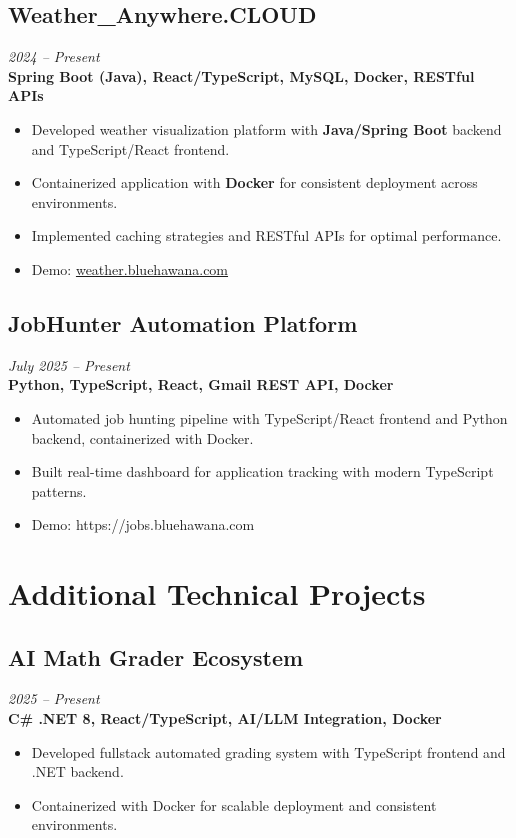\documentclass[10pt,a4paper]{article}
\begin{document}
\subsection*{Weather\_Anywhere.CLOUD}
\textit{2024 -- Present} \\
\textbf{Spring Boot (Java), React/TypeScript, MySQL, Docker, RESTful APIs}
\begin{itemize}[noitemsep]
\item Developed weather visualization platform with \textbf{Java/Spring Boot} backend and TypeScript/React frontend.
\item Containerized application with \textbf{Docker} for consistent deployment across environments.
\item Implemented caching strategies and RESTful APIs for optimal performance.
\item Demo: \href{https://weather.bluehawana.com}{weather.bluehawana.com}
\end{itemize}

\subsection*{JobHunter Automation Platform}
\textit{July 2025 -- Present} \\
\textbf{Python, TypeScript, React, Gmail REST API, Docker}
\begin{itemize}[noitemsep]
\item Automated job hunting pipeline with TypeScript/React frontend and Python backend, containerized with Docker.
\item Built real-time dashboard for application tracking with modern TypeScript patterns.
\item Demo: https://jobs.bluehawana.com
\end{itemize}

\section*{Additional Technical Projects}

\subsection*{AI Math Grader Ecosystem}
\textit{2025 -- Present} \\
\textbf{C\# .NET 8, React/TypeScript, AI/LLM Integration, Docker}
\begin{itemize}[noitemsep]
\item Developed fullstack automated grading system with TypeScript frontend and .NET backend.
\item Containerized with Docker for scalable deployment and consistent environments.
\end{itemize}
\end{document}
